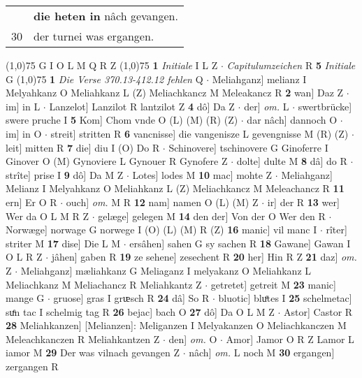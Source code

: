 \documentclass[8pt,a4paper,notitlepage]{article}
\begin{document}
\begin{table}[ht]
\begin{minipage}[t]{0.5\linewidth}
\begin{tabular}{rl}
 & \textbf{die heten in} nâch gevangen.\\ 
30 & der turnei was ergangen.\\ 
\end{tabular}
\scriptsize
\line(1,0){75} \newline
G I O L M Q R Z \newline
\line(1,0){75} \newline
\textbf{1} \textit{Initiale} I L Z   $\cdot$ \textit{Capitulumzeichen} R  \textbf{5} \textit{Initiale} G  \newline
\line(1,0){75} \newline
\textbf{1} \textit{Die Verse 370.13-412.12 fehlen} Q   $\cdot$ Meliahganz] melianz I Melyahkanz O Meliahkanz L (Z) Meliachkancz M Meleakancz R \textbf{2} wan] Daz Z  $\cdot$ im] in L  $\cdot$ Lanzelot] Lanzilot R lantzilot Z \textbf{4} dô] Da Z  $\cdot$ der] \textit{om.} L  $\cdot$ swertbrücke] swere pruche I \textbf{5} Kom] Chom vnde O (L) (M) (R) (Z)  $\cdot$ dar nâch] dannoch O  $\cdot$ im] in O  $\cdot$ streit] stritten R \textbf{6} vancnisse] die vangenisze L gevengnisse M (R) (Z)  $\cdot$ leit] mitten R \textbf{7} die] diu I (O) Do R  $\cdot$ Schinovere] tschinovere G Ginoferre I Ginover O (M) Gynoviere L Gynouer R Gynofere Z  $\cdot$ dolte] dulte M \textbf{8} dâ] do R  $\cdot$ strîte] prise I \textbf{9} dô] Da M Z  $\cdot$ Lotes] lodes M \textbf{10} mac] mohte Z  $\cdot$ Meliahganz] Melianz I Melyahkanz O Meliahkanz L (Z) Meliachkancz M Meleachancz R \textbf{11} ern] Er O R  $\cdot$ ouch] \textit{om.} M R \textbf{12} nam] namen O (L) (M) Z  $\cdot$ ir] der R \textbf{13} wer] Wer da O L M R Z  $\cdot$ gelæge] gelegen M \textbf{14} den der] Von der O Wer den R  $\cdot$ Norwæge] norwage G norwege I (O) (L) (M) R (Z) \textbf{16} manic] vil manc I  $\cdot$ rîter] striter M \textbf{17} dise] Die L M  $\cdot$ ersâhen] sahen G sy sachen R \textbf{18} Gawane] Gawan I O L R Z  $\cdot$ jâhen] gaben R \textbf{19} ze sehene] zesechent R \textbf{20} her] Hin R Z \textbf{21} daz] \textit{om.} Z  $\cdot$ Meliahganz] mæliahkanz G Meliaganz I melyakanz O Meliahkanz L Meliachkanz M Meliachancz R Meliahkantz Z  $\cdot$ getretet] getreit M \textbf{23} manic] mange G  $\cdot$ gruose] gras I grᵫsch R \textbf{24} dâ] So R  $\cdot$ bluotic] bluͤtes I \textbf{25} schelmetac] suͤn tac I schelmig tag R \textbf{26} bejac] bach O \textbf{27} dô] Da O L M Z  $\cdot$ Astor] Castor R \textbf{28} Meliahkanzen] [Melianzen]: Meliganzen I Melyakanzen O Meliachkanczen M Meleachkanczen R Meliahkantzen Z  $\cdot$ den] \textit{om.} O  $\cdot$ Amor] Jamor O R Z Lamor L iamor M \textbf{29} Der was vilnach gevangen Z  $\cdot$ nâch] \textit{om.} L noch M \textbf{30} ergangen] zergangen R \newline

\end{minipage}
\end{table}
\end{document}
